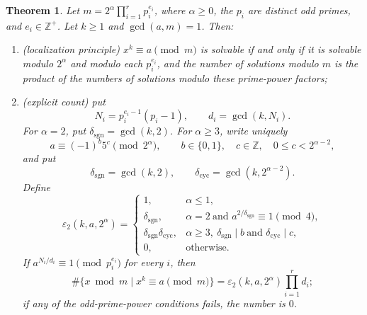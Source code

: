 \documentclass[11pt]{article}
\theoremstyle{ntstyle}
\newtheorem{theorem}{Theorem}[subsection]
\begin{document}
\begin{theorem}\label{thm:7.8.2}
  Let
  $m=2^\alpha\prod_{i=1}^r p_i^{e_i}$, where $\alpha\ge0$, the $p_i$
  are distinct odd primes, and $e_i\in\mathbb{Z}^+$. Let $k\ge1$ and
  $\gcd(a,m)=1$. Then:

  \begin{enumerate}[label={\alph*)}]
    \item (localization principle) $x^{k}\equiv a\pmod{m}$ is solvable
          if and only if it is solvable modulo $2^{\alpha}$ and modulo each
          $p_i^{e_i}$, and the number of solutions modulo $m$ is the product
          of the numbers of solutions modulo these prime-power factors;
    \item (explicit count) put
          \[
            N_i=p_i^{e_i-1}(p_i-1),\qquad d_i=\gcd(k,N_i).
          \]
          For $\alpha=2$, put
          $\delta_{\mathrm{sgn}}=\gcd(k,2)$. For $\alpha\ge3$, write
          uniquely
          \[
            a\equiv(-1)^b5^c\pmod{2^\alpha},\qquad
            b\in\{0,1\},\quad c\in\mathbb{Z},\quad
            0\le c<2^{\alpha-2},
          \]
          and put
          \[
            \delta_{\mathrm{sgn}}=\gcd(k,2),\qquad
            \delta_{\mathrm{cyc}}=\gcd(k,2^{\alpha-2}).
          \]
          Define
          \[
            \varepsilon_2(k,a,2^\alpha)=
            \begin{cases}
              1, & \alpha\le1,\\
              \delta_{\mathrm{sgn}},
              & \alpha=2\ \text{and }a^{2/\delta_{\mathrm{sgn}}}
                \equiv1\pmod{4},\\
              \delta_{\mathrm{sgn}}\delta_{\mathrm{cyc}},
              & \alpha\ge3,\
                \delta_{\mathrm{sgn}}\mid b\
                \text{and }\delta_{\mathrm{cyc}}\mid c,\\
              0, & \text{otherwise}.
            \end{cases}
          \]
          If $a^{N_i/d_i}\equiv1\pmod{p_i^{e_i}}$ for every $i$, then
          \[
            \#\{x\bmod m \mid x^k\equiv a\pmod{m}\}
            =\varepsilon_2(k,a,2^\alpha)\prod_{i=1}^r d_i;
          \]
          if any of the odd-prime-power conditions fails, the number is $0$.
  \end{enumerate}

\end{theorem}
\end{document}
